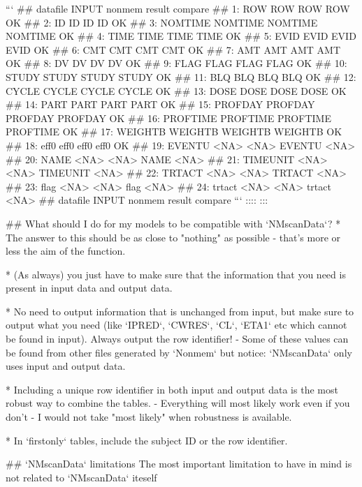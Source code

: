 {{{{{{```
##     datafile    INPUT   nonmem   result compare
##  1:      ROW      ROW      ROW      ROW      OK
##  2:       ID       ID       ID       ID      OK
##  3:  NOMTIME  NOMTIME  NOMTIME  NOMTIME      OK
##  4:     TIME     TIME     TIME     TIME      OK
##  5:     EVID     EVID     EVID     EVID      OK
##  6:      CMT      CMT      CMT      CMT      OK
##  7:      AMT      AMT      AMT      AMT      OK
##  8:       DV       DV       DV       DV      OK
##  9:     FLAG     FLAG     FLAG     FLAG      OK
## 10:    STUDY    STUDY    STUDY    STUDY      OK
## 11:      BLQ      BLQ      BLQ      BLQ      OK
## 12:    CYCLE    CYCLE    CYCLE    CYCLE      OK
## 13:     DOSE     DOSE     DOSE     DOSE      OK
## 14:     PART     PART     PART     PART      OK
## 15:  PROFDAY  PROFDAY  PROFDAY  PROFDAY      OK
## 16: PROFTIME PROFTIME PROFTIME PROFTIME      OK
## 17:  WEIGHTB  WEIGHTB  WEIGHTB  WEIGHTB      OK
## 18:     eff0     eff0     eff0     eff0      OK
## 19:   EVENTU     <NA>     <NA>   EVENTU    <NA>
## 20:     NAME     <NA>     <NA>     NAME    <NA>
## 21: TIMEUNIT     <NA>     <NA> TIMEUNIT    <NA>
## 22:   TRTACT     <NA>     <NA>   TRTACT    <NA>
## 23:     flag     <NA>     <NA>     flag    <NA>
## 24:   trtact     <NA>     <NA>   trtact    <NA>
##     datafile    INPUT   nonmem   result compare
```
\normalsize
::::
:::

## What should I do for my models to be compatible with `NMscanData`?
* The answer to this should be as close to "nothing" as possible -
that's more or less the aim of the function. 

* (As always) you just have to make
sure that the information that you need is present in input data and
output data. 

* No need to output information that is unchanged from
input, but make sure to output what you need (like `IPRED`, `CWRES`, `CL`,
`ETA1` etc which cannot be found in input). Always output the row identifier!
- Some of these values can be
found from other files generated by `Nonmem` but notice: `NMscanData` only uses input and output data.

* Including a unique row identifier in both input and
output data is the most robust way to combine the tables. 
- Everything
will most likely work even if you don't 
- I would not take "most likely" when robustness is available.

* In `firstonly` tables, include the subject ID or the row identifier. 


## `NMscanData` limitations
The most important limitation to have in mind is not related to `NMscanData` iteself

}}}}}}
